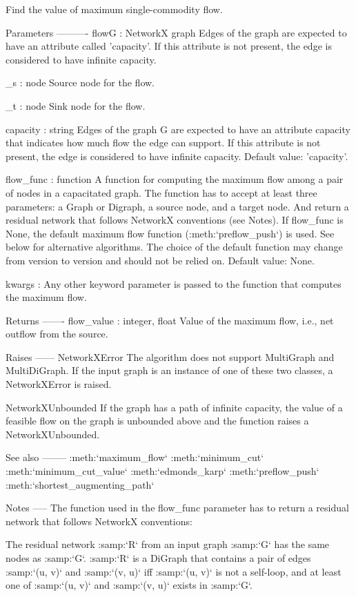 \begin{DoxyVerb}Find the value of maximum single-commodity flow.

Parameters
----------
flowG : NetworkX graph
    Edges of the graph are expected to have an attribute called
    'capacity'. If this attribute is not present, the edge is
    considered to have infinite capacity.

_s : node
    Source node for the flow.

_t : node
    Sink node for the flow.

capacity : string
    Edges of the graph G are expected to have an attribute capacity
    that indicates how much flow the edge can support. If this
    attribute is not present, the edge is considered to have
    infinite capacity. Default value: 'capacity'.

flow_func : function
    A function for computing the maximum flow among a pair of nodes
    in a capacitated graph. The function has to accept at least three
    parameters: a Graph or Digraph, a source node, and a target node.
    And return a residual network that follows NetworkX conventions
    (see Notes). If flow_func is None, the default maximum
    flow function (:meth:`preflow_push`) is used. See below for
    alternative algorithms. The choice of the default function may change
    from version to version and should not be relied on. Default value:
    None.

kwargs : Any other keyword parameter is passed to the function that
    computes the maximum flow.

Returns
-------
flow_value : integer, float
    Value of the maximum flow, i.e., net outflow from the source.

Raises
------
NetworkXError
    The algorithm does not support MultiGraph and MultiDiGraph. If
    the input graph is an instance of one of these two classes, a
    NetworkXError is raised.

NetworkXUnbounded
    If the graph has a path of infinite capacity, the value of a
    feasible flow on the graph is unbounded above and the function
    raises a NetworkXUnbounded.

See also
--------
:meth:`maximum_flow`
:meth:`minimum_cut`
:meth:`minimum_cut_value`
:meth:`edmonds_karp`
:meth:`preflow_push`
:meth:`shortest_augmenting_path`

Notes
-----
The function used in the flow_func parameter has to return a residual
network that follows NetworkX conventions:

The residual network :samp:`R` from an input graph :samp:`G` has the
same nodes as :samp:`G`. :samp:`R` is a DiGraph that contains a pair
of edges :samp:`(u, v)` and :samp:`(v, u)` iff :samp:`(u, v)` is not a
self-loop, and at least one of :samp:`(u, v)` and :samp:`(v, u)` exists
in :samp:`G`.


\end{DoxyVerb}
